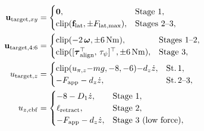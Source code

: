 \documentclass[letterpaper,10pt,conference]{IEEEtran}
\begin{document}
\begin{equation}
\begin{aligned}
\mathbf{u}_{\mathrm{target},xy}&=\begin{cases}
\mathbf{0}, & \text{Stage 1},\\
\mathrm{clip}(\mathbf{f}_{\mathrm{lat}},\pm F_{\mathrm{lat},\max}), & \text{Stages 2--3},
\end{cases}\\
\mathbf{u}_{\mathrm{target},4:6}&=\begin{cases}
\mathrm{clip}(-2\,\boldsymbol\omega,\pm 6\,\mathrm{Nm}), & \text{Stages 1--2},\\
\mathrm{clip}([\boldsymbol\tau_{\mathrm{align}}^\top,\,\tau_{\psi}]^\top,\pm 6\,\mathrm{Nm}), & \text{Stage 3},
\end{cases}\\
u_{\mathrm{target},z}&=\begin{cases}
\mathrm{clip}(u_{\pi,z}{-}mg,-8,-6){-}d_z\dot z, & \text{St.\,1},\\
-F_{\mathrm{app}}-d_z\dot z, & \text{St.\,2--3},
\end{cases}\\
u_{z,\mathrm{cbf}}&=\begin{cases}
-8-D_1\dot z, & \text{Stage 1},\\
\ell_{\mathrm{retract}}, & \text{Stage 2},\\
-F_{\mathrm{app}}-d_z\dot z, & \text{Stage 3 (low force)},
\end{cases}
\end{aligned}
\label{eq:uz_piecewise}
\end{equation}
\end{document}
